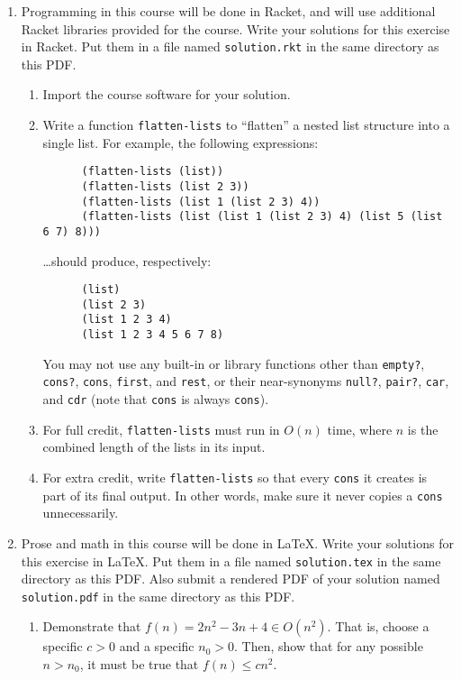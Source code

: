 \documentclass{article}
\begin{document}
\begin{enumerate}
\item
  Programming in this course will be done in Racket, and will use additional
  Racket libraries provided for the course.  Write your solutions for this
  exercise in Racket.  Put them in a file named \texttt{solution.rkt} in the
  same directory as this PDF.
  \begin{enumerate}
  \item
    Import the course software for your solution.
  \item
    Write a function \texttt{flatten-lists} to ``flatten'' a nested list
    structure into a single list.  For example, the following expressions:
    \begin{verbatim}
      (flatten-lists (list))
      (flatten-lists (list 2 3))
      (flatten-lists (list 1 (list 2 3) 4))
      (flatten-lists (list (list 1 (list 2 3) 4) (list 5 (list 6 7) 8)))
    \end{verbatim}
    \dots should produce, respectively:
    \begin{verbatim}
      (list)
      (list 2 3)
      (list 1 2 3 4)
      (list 1 2 3 4 5 6 7 8)
    \end{verbatim}
    You may not use any built-in or library functions other than
    \texttt{empty?}, \texttt{cons?}, \texttt{cons}, \texttt{first},
    and \texttt{rest}, or their near-synonyms \texttt{null?}, \texttt{pair?}, 
    \texttt{car}, and \texttt{cdr} (note that \texttt{cons} is always
    \texttt{cons}).
  \item
    For full credit, \texttt{flatten-lists} must run in \(O(n)\) time, where
    \(n\) is the combined length of the lists in its input.
  \item
    For extra credit, write \texttt{flatten-lists} so that every \texttt{cons}
    it creates is part of its final output.  In other words, make sure it never
    copies a \texttt{cons} unnecessarily.
  \end{enumerate}

\item
  Prose and math in this course will be done in \LaTeX{}.  Write your solutions
  for this exercise in \LaTeX{}.  Put them in a file named \texttt{solution.tex}
  in the same directory as this PDF.  Also submit a rendered PDF of your
  solution named \texttt{solution.pdf} in the same directory as this PDF.

  \begin{enumerate}

  \item Demonstrate that
    \(f(n) = 2n^2 - 3n + 4 \in O(n^2)\).
    That is, choose a specific \(c>0\) and a specific \(n_0 > 0\).
    Then, show that for any possible \(n > n_0\), it must be true that
    \(f(n) \leq c n^2\).


\end{enumerate}
\end{enumerate}
\end{document}
